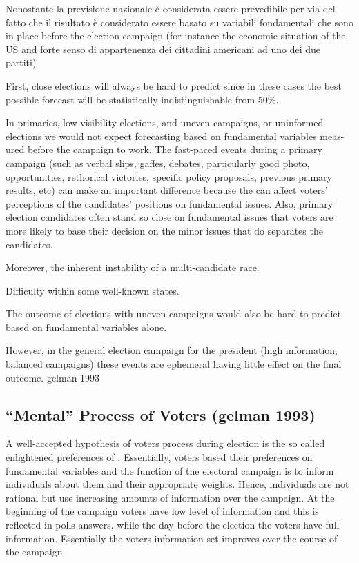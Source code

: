 \documentclass[
  12pt]{article}
\begin{document}
Nonostante la previsione nazionale è considerata essere prevedibile per
via del fatto che il risultato è considerato essere basato su variabili
fondamentali che sono in place before the election campaign (for
instance the economic situation of the US and forte senso di
appartenenza dei cittadini americani ad uno dei due partiti)

First, close elections will always be hard to predict since in these
cases the best possible forecast will be statistically indistinguishable
from 50\%.

In primaries, low-visibility elections, and uneven campaigns, or
uninformed elections we would not expect forecasting based on
fundamental variables meas- ured before the campaign to work. The
fast-paced events during a primary campaign (such as verbal slips,
gaffes, debates, particularly good photo, opportunities, rethorical
victories, specific policy proposals, previous primary results, etc) can
make an important difference because the can affect voters' perceptions
of the candidates' positions on fundamental issues. Also, primary
election candidates often stand so close on fundamental issues that
voters are more likely to base their decision on the minor issues that
do separates the candidates.

Moreover, the inherent instability of a multi-candidate race.

Difficulty within some well-known states.

The outcome of elections with uneven campaigns would also be hard to
predict based on fundamental variables alone.

However, in the general election campaign for the president (high
information, balanced campaigns) these events are ephemeral having
little effect on the final outcome. gelman 1993

\hypertarget{mental-process-of-voters-gelman-1993}{%
\subsection{``Mental'' Process of Voters (gelman
1993)}\label{mental-process-of-voters-gelman-1993}}

A well-accepted hypothesis of voters process during election is the so
called enlightened preferences of \citet{gelman1993}. Essentially,
voters based their preferences on fundamental variables and the function
of the electoral campaign is to inform individuals about them and their
appropriate weights. Hence, individuals are not rational but use
increasing amounts of information over the campaign. At the beginning of
the campaign voters have low level of information and this is reflected
in polls answers, while the day before the election the voters have full
information. Essentially the voters information set improves over the
course of the campaign.
\end{document}

